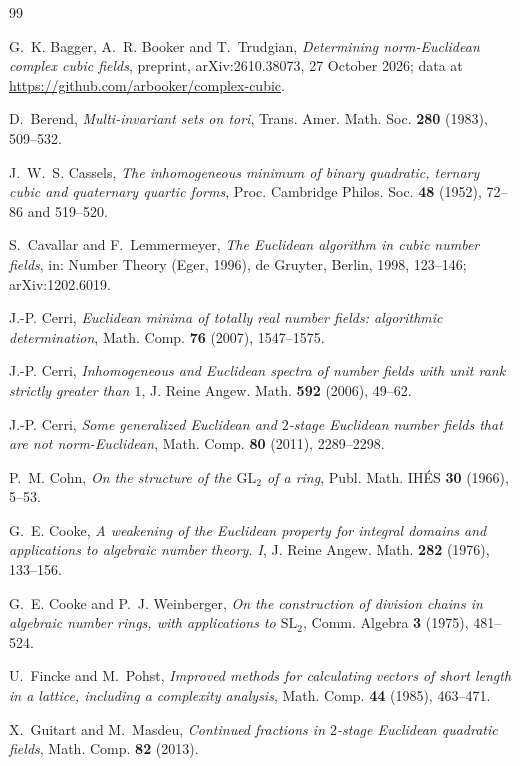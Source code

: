 \documentclass[11pt]{amsart}
\theoremstyle{definition}
\theoremstyle{remark}
\numberwithin{equation}{section}
\begin{document}
\begin{thebibliography}{99}

G.~K. Bagger, A.~R. Booker and T.~Trudgian, \emph{Determining norm-Euclidean complex cubic
fields}, preprint, arXiv:2610.38073, 27 October 2026; data at
\url{https://github.com/arbooker/complex-cubic}.

D.~Berend, \emph{Multi-invariant sets on tori}, Trans. Amer. Math. Soc. \textbf{280} (1983),
509--532.

J.~W.~S. Cassels, \emph{The inhomogeneous minimum of binary quadratic, ternary cubic and
quaternary quartic forms}, Proc. Cambridge Philos. Soc. \textbf{48} (1952), 72--86 and 519--520.

S.~Cavallar and F.~Lemmermeyer, \emph{The Euclidean algorithm in cubic number fields}, in:
Number Theory (Eger, 1996), de Gruyter, Berlin, 1998, 123--146; arXiv:1202.6019.

J.-P. Cerri, \emph{Euclidean minima of totally real number fields: algorithmic determination},
Math. Comp. \textbf{76} (2007), 1547--1575.

J.-P. Cerri, \emph{Inhomogeneous and Euclidean spectra of number fields with unit rank strictly
greater than $1$}, J. Reine Angew. Math. \textbf{592} (2006), 49--62.

J.-P. Cerri, \emph{Some generalized Euclidean and $2$-stage Euclidean number fields that are not
norm-Euclidean}, Math. Comp. \textbf{80} (2011), 2289--2298.

P.~M. Cohn, \emph{On the structure of the $\mathrm{GL}_2$ of a ring}, Publ. Math. IHÉS
\textbf{30} (1966), 5--53.

G.~E. Cooke, \emph{A weakening of the Euclidean property for integral domains and applications
to algebraic number theory. I}, J. Reine Angew. Math. \textbf{282} (1976), 133--156.

G.~E. Cooke and P.~J. Weinberger, \emph{On the construction of division chains in algebraic number
rings, with applications to $\mathrm{SL}_2$}, Comm. Algebra \textbf{3} (1975), 481--524.

U.~Fincke and M.~Pohst, \emph{Improved methods for calculating vectors of short length in a
lattice, including a complexity analysis}, Math. Comp. \textbf{44} (1985), 463--471.

X.~Guitart and M.~Masdeu, \emph{Continued fractions in $2$-stage Euclidean quadratic fields},
Math. Comp. \textbf{82} (2013).


\end{thebibliography}
\end{document}
